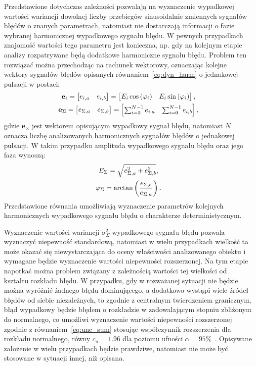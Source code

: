 Przedstawione dotychczas zależności pozwalają na wyznaczenie wypadkowej wartości wariancji dowolnej liczby przebiegów sinusoidalnie zmiennych sygnałów błędów o znanych parametrach, natomiast nie dostarczają informacji o fazie wybranej harmonicznej wypadkowego sygnału błędu. W pewnych przypadkach znajomość wartości tego parametru jest konieczna, np. gdy na kolejnym etapie analizy rozpatrywane będą dodatkowe harmoniczne sygnału błędu. Problem ten rozwiązać można przechodząc na rachunek wektorowy, oznaczając kolejne wektory sygnałów błędów opisanych równaniem~\eqref{eq:dyn_harm} o jednakowej pulsacji w postaci:
\begin{gather}
\mathbf{e}_{i} =
\begin{bmatrix}
e_{i,a} & e_{i,b}
\end{bmatrix}
=
\begin{bmatrix}
E_{i} \cos \left(\varphi_{i}\right) & E_{i} \sin \left(\varphi_{i}\right)
\end{bmatrix}
\label{eq:dyn_vect}, \\
\mathbf{e}_{\Sigma} =
\begin{bmatrix}
e_{\Sigma,a} & e_{\Sigma,b}
\end{bmatrix}
=
\begin{bmatrix}
\sum _{i = 0} ^{N-1} e_{i,a} & \sum _{i = 0} ^{N-1} e_{i,b}
\end{bmatrix}
\label{eq:dyn_vect_sum},
\end{gather}
gdzie $\mathbf{e}_{\Sigma}$ jest wektorem opisującym wypadkowy sygnał błędu, natomiast $N$ oznacza liczbę analizowanych harmonicznych sygnałów błędów o jednakowej pulsacji. W takim przypadku amplituda wypadkowego sygnału błędu oraz jego faza wynoszą:
\begin{gather}
E_{\Sigma} = \sqrt{e_{\Sigma,a}^{2} + e_{\Sigma,b}^{2}} \label{eq:dyn_vect_amp}, \\
\varphi_{\Sigma} = \arctan \left(\frac{e_{\Sigma,b}}{e_{\Sigma,a}}\right) \label{eq:dyn_vect_phi}.
\end{gather}
Przedstawione równania umożliwiają wyznaczenie parametrów kolejnych harmonicznych wypadkowego sygnału błędu o charakterze deterministycznym.

Wyznaczenie wartości wariancji $\sigma_{\Sigma}^{2}$ wypadkowego sygnału błędu pozwala wyznaczyć niepewność standardową, natomiast w wielu przypadkach wielkość ta może okazać się niewystarczająca do oceny właściwości analizowanego obiektu i wymagane będzie wyznaczenie wartości niepewności rozszerzonej. Na tym etapie napotkać można problem związany z zależnością wartości tej wielkości od kształtu rozkładu błędu. W przypadku, gdy w rozważanej sytuacji nie będzie można wyróżnić żadnego błędu dominującego, a dodatkowo wystąpi wiele źródeł błędów od siebie niezależnych, to zgodnie z centralnym twierdzeniem granicznym, błąd wypadkowy będzie błędem o rozkładzie w zadowalającym stopniu zbliżonym do normalnego, co umożliwi wyznaczenie wartości niepewności rozszerzonej zgodnie z równaniem~\eqref{eq:unc_sum} stosując współczynnik rozszerzenia dla rozkładu normalnego, równy $c_{n} = 1.96$ dla poziomu ufności $\alpha = 95\%$~\cite{jcgm_guide}. Opisywane założenie w wielu przypadkach będzie prawdziwe, natomiast nie może być stosowane w sytuacji innej, niż opisana.

